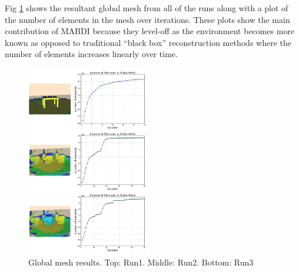 Fig \ref{fig:gm} shows the resultant global mesh from all of the runs along with a plot of the number of elements in the mesh over iterations. These plots show the main contribution of MABDI because they level-off as the environment becomes more known as opposed to traditional ``black box'' reconstruction methods where the number of elements increases linearly over time.

\begin{figure}[h]%
\centering
\includegraphics[width=0.48\textwidth]{figures/diagram_run123_gm.png}
\caption{Global mesh results. Top: Run1. Middle: Run2. Bottom: Run3}
\label{fig:gm}
\end{figure}
